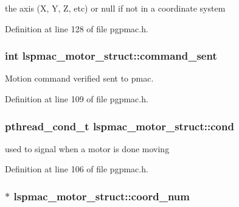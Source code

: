 the axis (X, Y, Z, etc) or null if not in a coordinate system 



Definition at line 128 of file pgpmac.\-h.

\hypertarget{structlspmac__motor__struct_a59a7f007476b2428fd3c5bd7f24440e8}{
\subsubsection[{command\-\_\-sent}]{\setlength{\rightskip}{0pt plus 5cm}int lspmac\-\_\-motor\-\_\-struct\-::command\-\_\-sent}}\label{structlspmac__motor__struct_a59a7f007476b2428fd3c5bd7f24440e8}


Motion command verified sent to pmac. 



Definition at line 109 of file pgpmac.\-h.

\hypertarget{structlspmac__motor__struct_aa0ea4108b8fed5b41ff91ca7266f3d84}{
\subsubsection[{cond}]{\setlength{\rightskip}{0pt plus 5cm}pthread\-\_\-cond\-\_\-t lspmac\-\_\-motor\-\_\-struct\-::cond}}\label{structlspmac__motor__struct_aa0ea4108b8fed5b41ff91ca7266f3d84}


used to signal when a motor is done moving 



Definition at line 106 of file pgpmac.\-h.

\hypertarget{structlspmac__motor__struct_a5614e003272e8323f8809bf7b6559532}{
\subsubsection[{coord\-\_\-num}]{$\ast$ lspmac\-\_\-motor\-\_\-struct\-::coord\-\_\-num}}\label{structlspmac__motor__struct_a5614e003272e8323f8809bf7b6559532}


